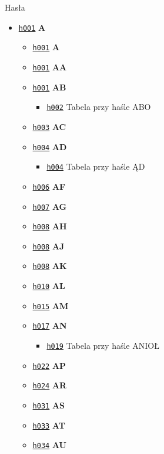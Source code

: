 \documentclass[12]{mwart}
\begin{document}

Hasła
\begin{itemize}
\item \href{\pai{1}{133}}{\texttt{h001}} \textbf{A}
  \begin{itemize}
  \item \href{\pai{1}{133}}{\texttt{h001}} \textbf{A}
  \item \href{\pai{1}{133}}{\texttt{h001}} \textbf{AA}
  \item \href{\pai{1}{133}}{\texttt{h001}} \textbf{AB}
    \begin{itemize}
    \item \href{\pai{1}{134}}{\texttt{h002}} Tabela przy haśle ABO
    \end{itemize}
  \item \href{\pai{1}{135}}{\texttt{h003}} \textbf{AC}
  \item \href{\pai{1}{136}}{\texttt{h004}} \textbf{AD}
    \begin{itemize}
    \item \href{\pai{1}{136}}{\texttt{h004}} Tabela przy haśle ĄD
    \end{itemize}
  \item \href{\pai{1}{138}}{\texttt{h006}} \textbf{AF}
  \item \href{\pai{1}{139}}{\texttt{h007}} \textbf{AG}
  \item \href{\pai{1}{140}}{\texttt{h008}} \textbf{AH}
  \item \href{\pai{1}{140}}{\texttt{h008}} \textbf{AJ}
  \item \href{\pai{1}{140}}{\texttt{h008}} \textbf{AK}
  \item \href{\pai{1}{142}}{\texttt{h010}} \textbf{AL}
  \item \href{\pai{1}{147}}{\texttt{h015}} \textbf{AM}
  \item \href{\pai{1}{149}}{\texttt{h017}} \textbf{AN}
     \begin{itemize}
    \item \href{\pai{1}{151}}{\texttt{h019}} Tabela przy haśle ANIOŁ
    \end{itemize}
  \item \href{\pai{1}{154}}{\texttt{h022}} \textbf{AP}
  \item \href{\pai{1}{156}}{\texttt{h024}} \textbf{AR}
  \item \href{\pai{1}{163}}{\texttt{h031}} \textbf{AS}
  \item \href{\pai{1}{165}}{\texttt{h033}} \textbf{AT}
  \item \href{\pai{1}{166}}{\texttt{h034}} \textbf{AU}

\end{itemize}
\end{itemize}
\end{document}
